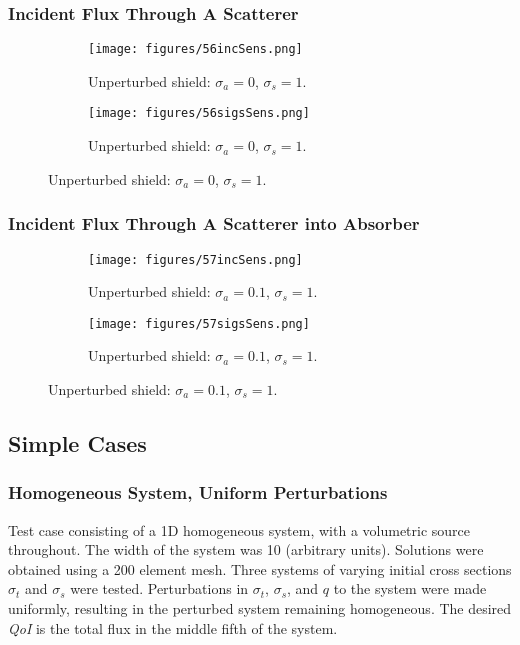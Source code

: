 \documentclass{article}
\newcommand{\sigt}{\sigma_t}
\newcommand{\sigs}{\sigma_s}
\newcommand{\siga}{\sigma_a}
\newcommand{\scalSource}{q}
\newcommand{\qoi}{{\it QoI}\xspace}
\begin{document}
\subsubsection{Incident Flux Through A Scatterer}

\begin{figure}[H]
\label{Scatterer}
\centering
\begin{subfigure}{.5\textwidth}
  \centering
  \texttt{[image: figures/56incSens.png]}
  \caption{Unperturbed shield: $\siga=0$, $\sigs=1$. }
  \label{fig:sfig1}
\end{subfigure}%
\begin{subfigure}{.5\textwidth}
  \centering
  \texttt{[image: figures/56sigsSens.png]}
  \caption{Unperturbed shield: $\siga=0$, $\sigs=1$. }
  \label{fig:sfig2}
\end{subfigure}
\end{figure}

\subsubsection{Incident Flux Through A Scatterer into Absorber}

\begin{figure}[H]
\label{Scatterer}
\centering
\begin{subfigure}{.5\textwidth}
  \centering
  \texttt{[image: figures/57incSens.png]}
  \caption{Unperturbed shield: $\siga=0.1$, $\sigs=1$. }
  \label{fig:sfig1}
\end{subfigure}%
\begin{subfigure}{.5\textwidth}
  \centering
  \texttt{[image: figures/57sigsSens.png]}
  \caption{Unperturbed shield: $\siga=0.1$, $\sigs=1$. }
  \label{fig:sfig2}
\end{subfigure}
\end{figure}

\subsection{Simple Cases}
\subsubsection{Homogeneous System, Uniform Perturbations}
Test case consisting of a 1D homogeneous system, with a volumetric source throughout. The width of the system was 10 (arbitrary units). Solutions were obtained using a 200 element mesh. Three systems of varying initial cross sections $\sigt$ and $\sigs$ were tested. Perturbations in $\sigt$, $\sigs$, and $\scalSource$ to the system were made uniformly, resulting in the perturbed system remaining homogeneous. The desired \qoi is the total flux in the middle fifth of the system.
\end{document}
